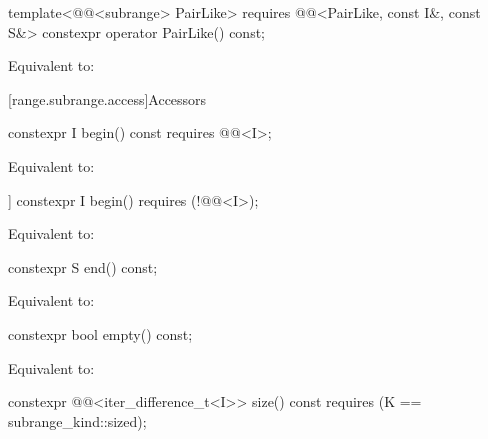 %
\begin{itemdecl}
template<@@<subrange> PairLike>
  requires @@<PairLike, const I&, const S&>
constexpr operator PairLike() const;
\end{itemdecl}

\begin{itemdescr}
\pnum
\effects
Equivalent to: 
\end{itemdescr}

[range.subrange.access]{Accessors}

%
\begin{itemdecl}
constexpr I begin() const requires @@<I>;
\end{itemdecl}

\begin{itemdescr}
\pnum
\effects
Equivalent to: 
\end{itemdescr}

%
\begin{itemdecl}
[[nodiscard]] constexpr I begin() requires (!@@<I>);
\end{itemdecl}

\begin{itemdescr}
\pnum
\effects
Equivalent to: 
\end{itemdescr}

%
\begin{itemdecl}
constexpr S end() const;
\end{itemdecl}

\begin{itemdescr}
\pnum
\effects
Equivalent to: 
\end{itemdescr}

%
\begin{itemdecl}
constexpr bool empty() const;
\end{itemdecl}

\begin{itemdescr}
\pnum
\effects
Equivalent to: 
\end{itemdescr}

%
\begin{itemdecl}
constexpr @@<iter_difference_t<I>> size() const
  requires (K == subrange_kind::sized);
\end{itemdecl}

